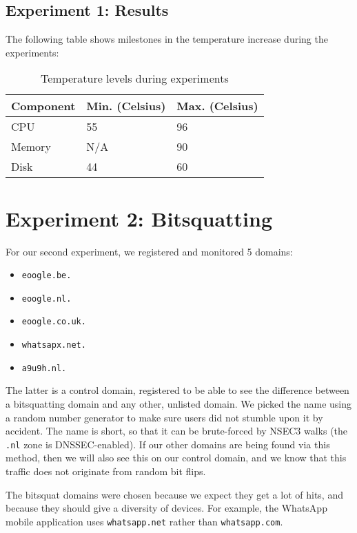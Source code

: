 \documentclass[conference]{IEEEtran}
\begin{document}
\subsection{Experiment 1: Results}

The following table shows milestones in the temperature increase during the
experiments:

\begin{table}[H]
  \centering
  \caption{Temperature levels during experiments}
  \label{table-temp}
  \begin{tabular}{|l|l|l|}
    \hline
    \textbf{Component}   & \textbf{Min. (Celsius)} & \textbf{Max. (Celsius)}\\ \hline
    CPU   & 55 & 96 \\ \hline
    Memory & N/A & 90 \\ \hline
    Disk & 44 & 60 \\ \hline
   \end{tabular}
\end{table}


\section{Experiment 2: Bitsquatting}

For our second experiment, we registered and monitored 5 domains:

\begin{itemize}
  \item \texttt{eoogle.be.}
  \item \texttt{eoogle.nl.}
  \item \texttt{eoogle.co.uk.}
  \item \texttt{whatsapx.net.}
  \item \texttt{a9u9h.nl.}
\end{itemize}

The latter is a control domain, registered to be able to see the difference
between a bitsquatting domain and any other, unlisted domain. We picked the
name using a random number generator to make sure users did not stumble upon it
by accident. The name is short, so that it can be brute-forced by NSEC3 walks
(the \texttt{.nl} zone is DNSSEC-enabled). If our other domains are being found
via this method, then we will also see this on our control domain, and we know
that this traffic does not originate from random bit flips.

The bitsquat domains were chosen because we expect they get a lot of hits, and
because they should give a diversity of devices. For example, the WhatsApp
mobile application uses \texttt{whatsapp.net} rather than
\texttt{whatsapp.com}.
\end{document}
